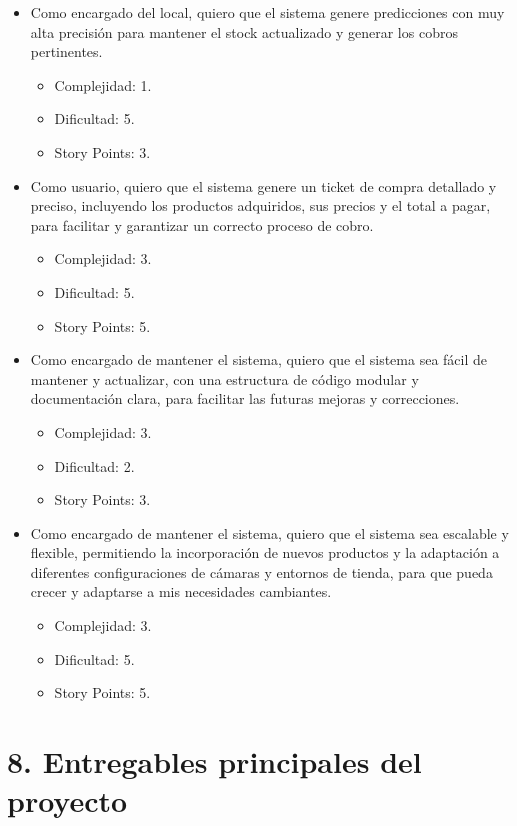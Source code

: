 \documentclass[
11pt, %
]{charter}
\begin{document}
\begin{itemize}
	\item Como encargado del local, quiero que el sistema genere predicciones con muy alta precisión para mantener el stock actualizado y generar los cobros pertinentes.
	\begin{itemize}
	\item Complejidad: 1.
	\item Dificultad: 5.
	\item Story Points: 3.
	\end{itemize}
	\item Como usuario, quiero que el sistema genere un ticket de compra detallado y preciso, incluyendo los productos adquiridos, sus precios y el total a pagar, para facilitar y garantizar un correcto proceso de cobro.
	\begin{itemize}
	\item Complejidad: 3.
	\item Dificultad: 5.
	\item Story Points: 5.
	\end{itemize}
	\item Como encargado de mantener el sistema, quiero que el sistema sea fácil de mantener y actualizar, con una estructura de código modular y documentación clara, para facilitar las futuras mejoras y correcciones.
	\begin{itemize}
	\item Complejidad: 3.
	\item Dificultad: 2.
	\item Story Points: 3.
	\end{itemize}
	\item Como encargado de mantener el sistema, quiero que el sistema sea escalable y flexible, permitiendo la incorporación de nuevos productos y la adaptación a diferentes configuraciones de cámaras y entornos de tienda, para que pueda crecer y adaptarse a mis necesidades cambiantes.
	\begin{itemize}
	\item Complejidad: 3.
	\item Dificultad: 5.
	\item Story Points: 5.
	\end{itemize}
\end{itemize}

\section{8. Entregables principales del proyecto}
\label{sec:entregables}
\end{document}
